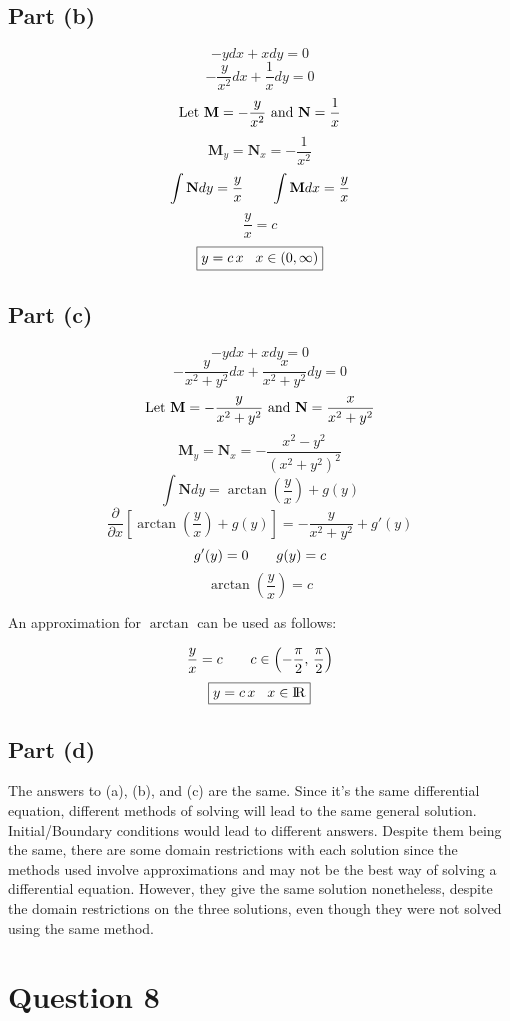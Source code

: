 \documentclass{article}
\begin{document}
\subsection*{Part (b)}
\[-ydx+xdy=0\]
\[-\frac{y}{x^2}dx+\frac{1}{x}dy=0\]
\[\textnormal{Let } \textbf{M}=-\frac{y}{x^2} \textnormal{ and } \textbf{N}=\frac{1}{x}\]
\[\textbf{M}_y=\textbf{N}_x=-\frac{1}{x^2}\]
\[\int\textbf{N}dy=\frac{y}{x}\hspace{7 mm}\int\textbf{M}dx=\frac{y}{x}\]
\[\frac{y}{x}=c\]
\[\boxed{y=c\,x\hspace{3 mm}x\in(0,\infty)}\]
\subsection*{Part (c)}
\[-ydx+xdy=0\]
\[-\frac{y}{x^2+y^2}dx+\frac{x}{x^2+y^2}dy=0\]
\[\textnormal{Let } \textbf{M}=-\frac{y}{x^2+y^2} \textnormal{ and } \textbf{N}=\frac{x}{x^2+y^2}\]
\[\textbf{M}_y=\textbf{N}_x=-\frac{x^2-y^2}{(x^2+y^2)^2}\]
\[\int\textbf{N}dy=\arctan\left(\frac{y}{x}\right)+g(y)\]
\[\frac{\partial}{\partial x}\left[\arctan\left(\frac{y}{x}\right)+g(y)\right]=-\frac{y}{x^2+y^2}+g'(y)\]
\[g'(y)=0\hspace{7 mm}g(y)=c\]
\[\arctan\left(\frac{y}{x}\right)=c\]
\begin{center}
An approximation for \(\arctan\) can be used as follows:
\end{center}
\[\frac{y}{x}=c\hspace{7 mm}c\in\left(-\frac{\pi}{2},\,\frac{\pi}{2}\right)\]
\[\boxed{y=c\,x\hspace{3 mm}x\in{\rm I\!R}}\]
\subsection*{Part (d)}
The answers to (a), (b), and (c) are the same. Since it's the same differential equation, different methods of solving will lead to the same general solution. Initial/Boundary conditions would lead to different answers. Despite them being the same, there are some domain restrictions with each solution since the methods used involve approximations and may not be the best way of solving a differential equation. However, they give the same solution nonetheless, despite the domain restrictions on the three solutions, even though they were not solved using the same method.
\section*{Question 8}
\end{document}
